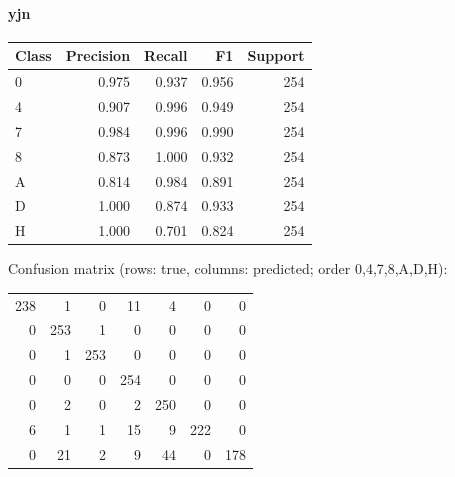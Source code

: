 \paragraph{yjn}\begin{center}\begin{tabular}{lrrrr}\toprule Class & Precision & Recall & F1 & Support \\ \midrule
0 & 0.975 & 0.937 & 0.956 & 254 \\
4 & 0.907 & 0.996 & 0.949 & 254 \\
7 & 0.984 & 0.996 & 0.990 & 254 \\
8 & 0.873 & 1.000 & 0.932 & 254 \\
A & 0.814 & 0.984 & 0.891 & 254 \\
D & 1.000 & 0.874 & 0.933 & 254 \\
H & 1.000 & 0.701 & 0.824 & 254 \\
\bottomrule\end{tabular}\end{center}
\noindent Confusion matrix (rows: true, columns: predicted; order 0,4,7,8,A,D,H):
\begin{center}\begin{tabular}{rrrrrrr}
238 & 1 & 0 & 11 & 4 & 0 & 0 \\
0 & 253 & 1 & 0 & 0 & 0 & 0 \\
0 & 1 & 253 & 0 & 0 & 0 & 0 \\
0 & 0 & 0 & 254 & 0 & 0 & 0 \\
0 & 2 & 0 & 2 & 250 & 0 & 0 \\
6 & 1 & 1 & 15 & 9 & 222 & 0 \\
0 & 21 & 2 & 9 & 44 & 0 & 178 \\
\end{tabular}\end{center}
